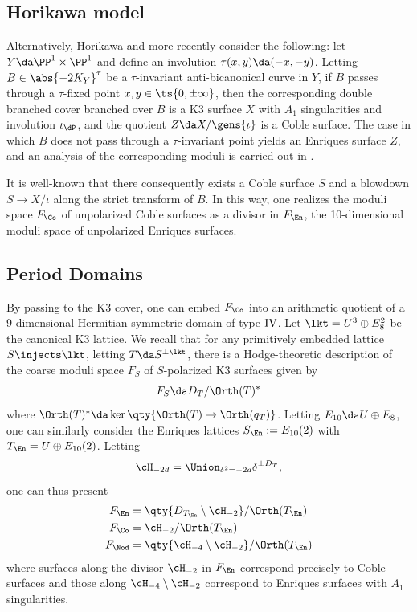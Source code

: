 \documentclass[../main.tex]{subfiles}
\begin{document}
\subsection{Horikawa model}
\begin{remark}
Alternatively, Horikawa \cite{Hor78} and more recently \cite{AEGS23} consider the following: let $Y\da \PP^1\times \PP^1$ and define an involution $\tau(x,y) \da (-x,-y)$. Letting $B\in\abs{-2K_{Y}}^\tau$ be a $\tau$-invariant anti-bicanonical curve in $Y$, if $B$ passes through a $\tau$-fixed point $x,y\in \ts{0, \pm \infty}$, then the corresponding double branched cover branched over $B$ is a K3 surface $X$ with $A_1$ singularities and involution $\iota_{\dP}$, and the quotient $Z\da X/\gens{\iota}$ is a Coble surface. The case in which $B$ does not pass through a $\tau$-invariant point yields an Enriques surface $Z$, and an analysis of the corresponding moduli is carried out in \cite{AEGS23}.


It is well-known that there consequently exists a Coble surface $S$ and a blowdown $S\to X/\iota$ along the strict transform of $B$. In this way, one realizes the moduli space $F_{\Co}$ of unpolarized Coble surfaces as a divisor in $F_{\En}$, the 10-dimensional moduli space of unpolarized Enriques surfaces.
\end{remark}

\subsection{Period Domains}

By passing to the K3 cover, one can embed $F_\Co$ into an arithmetic quotient of a 9-dimensional Hermitian symmetric domain of type $\rm{IV}$. Let $\lkt = U^3 \oplus E_8^2$ be the canonical K3 lattice. We recall that for any primitively embedded lattice $S\injects \lkt$, letting $T \da S^{\perp \lkt}$, there is a Hodge-theoretic description of the coarse moduli space $F_S$ of $S$-polarized K3 surfaces given by
\[
F_S \da D_T/\Orth(T)^*
\]
where $\Orth(T)^* \da \ker\qty{\Orth(T) \to \Orth(q_T)}$.
Letting $E_{10} \da U \oplus E_8$, one can similarly consider the Enriques lattices $S_\En := E_{10}(2)$ with $T_\En = U \oplus E_{10}(2)$. Letting
\[
\cH_{-2d} = \Union_{\delta^2 = -2d} \delta^{\perp D_T}
,\]
one can thus present
\begin{align*}
F_{\En} &= \qty{D_{T_\En} \setminus \cH_{-2}} / \Orth(T_\En) \\
F_{\Co} &= \cH_{-2} / \Orth(T_\En) \\
F_{\Nod} &= \qty{\cH_{-4} \setminus \cH_{-2}} / \Orth(T_\En)
\end{align*}
where surfaces along the divisor $\cH_{-2}$ in $F_\En$ correspond precisely to Coble surfaces and those along $\cH_{-4}\setminus \cH_{-2}$ correspond to Enriques surfaces with $A_1$ singularities.
\end{document}
